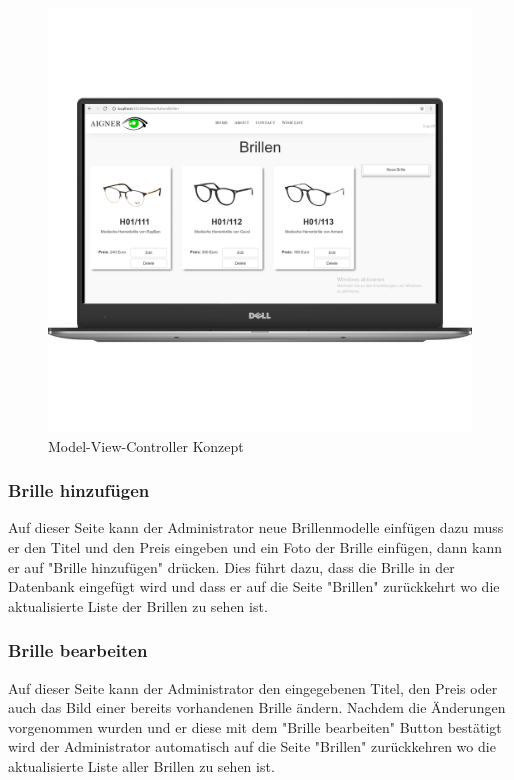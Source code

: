 \begin{figure}[H]
\begin{center}
	\includegraphics[scale=.2]{images/AdminBrillen.png}
\end{center}
	\caption{Model-View-Controller Konzept}
	\label{fig:sample}
\end{figure}

\subsubsection{Brille hinzufügen}
Auf dieser Seite kann der Administrator neue Brillenmodelle einfügen dazu muss er den Titel und den Preis eingeben und ein Foto der Brille einfügen, dann kann er auf "Brille hinzufügen" drücken. Dies führt dazu, dass die Brille in der Datenbank eingefügt wird und dass er auf die Seite "Brillen" zurückkehrt wo die aktualisierte Liste der Brillen zu sehen ist.

\subsubsection{Brille bearbeiten}
Auf dieser Seite kann der Administrator den eingegebenen Titel, den Preis oder auch das Bild einer bereits vorhandenen Brille ändern. Nachdem die Änderungen vorgenommen wurden und er diese mit dem "Brille bearbeiten" Button bestätigt wird der Administrator automatisch auf die Seite "Brillen" zurückkehren wo die aktualisierte Liste aller Brillen zu sehen ist.

